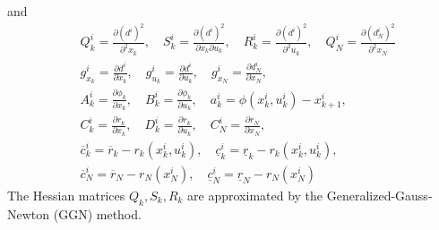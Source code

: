 \documentclass{article}
\begin{document}
and
\begin{equation}\label{QP data}
\begin{aligned}
&Q_k^i = \frac{\partial (d^i)^2}{\partial^2 x_k},\quad S_k^i =\frac{\partial (d^i)^2}{\partial x_k \partial u_k},\quad R^i_k= \frac{\partial (d^i)^2}{\partial^2 u_k},\quad Q_N^i = \frac{\partial (d^i_N)^2}{\partial^2 x_N}\\
&g_{x_k}^i = \frac{\partial d^i}{\partial x_k},\quad g_{u_k}^i = \frac{\partial d^i}{\partial u_k},\quad g_{x_N}^i = \frac{\partial d^i_N}{\partial x_N},\\
&A_k^i=\frac{\partial \phi_k}{\partial x_k}, \quad B_k^i=\frac{\partial \phi_k}{\partial u_k},\quad a_k^i = \phi(x_k^i,u_k^i)-x_{k+1}^i,\\
&C_k^i=\frac{\partial r_k}{\partial x_k}, \quad D_k^i=\frac{\partial r_k}{\partial u_k},\quad C_N^i=\frac{\partial r_N}{\partial x_N},\\
&\overline{c}_k^i=\overline{r}_k-r_k(x_k^i,u_k^i),\quad  \underline{c}_k^i=\underline{r}_k-r_k(x_k^i,u_k^i),\\
&\overline{c}_N^i=\overline{r}_N-r_N(x_N^i),\quad  \underline{c}_N^i=\underline{r}_N-r_N(x_N^i)
\end{aligned}
\end{equation}
The Hessian matrices $Q_k,S_k,R_k$ are approximated by the Generalized-Gauss-Newton (GGN) method.
\end{document}
